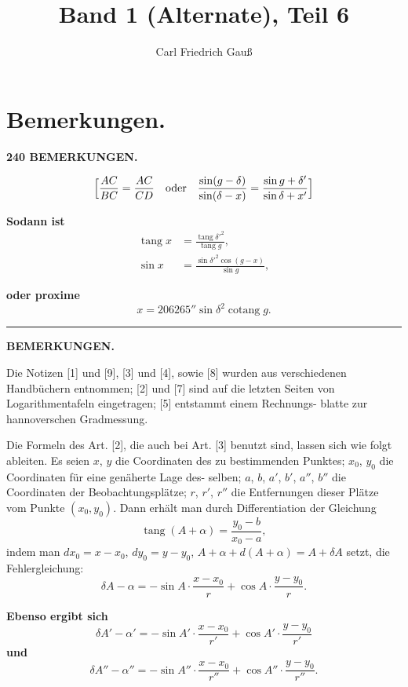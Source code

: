 \documentclass[12pt,a4paper]{article}
\title{Band 1 (Alternate), Teil 6}
\author{Carl Friedrich Gau\ss}
\date{}
\theoremstyle{plain}
\theoremstyle{definition}
\theoremstyle{remark}
\DeclareMathOperator{\tang}{tang}
\DeclareMathOperator{\cotang}{cotang}
\begin{document}
\maketitle

\newpage

\section*{Bemerkungen.}

\noindent\textbf{240 BEMERKUNGEN.}

\[
\Bigl[\frac{AC}{BC} = \frac{AC}{CD} \quad\text{oder}\quad
\frac{\sin(g-\delta)}{\sin(\delta-x)} = \frac{\sin g + \delta'}{\sin\delta + x'} \Bigr]
\]

\textbf{Sodann ist}
\begin{align*}
\tang x &= \frac{\tang\delta'^2}{\tang g},\\
\sin x &= \frac{\sin\delta'^2 \cos(g-x)}{\sin g},
\end{align*}

\textbf{oder proxime}
\[
x = 206265'' \sin\delta^2 \cotang g.
\]

\bigskip\hrule\bigskip

\begin{center}\textbf{BEMERKUNGEN.}\end{center}

Die Notizen [1] und [9], [3] und [4], sowie [8] wurden aus verschiedenen Handb\"uchern entnommen; [2]
und [7] sind auf die letzten Seiten von Logarithmentafeln eingetragen; [5] entstammt einem Rechnungs-
blatte zur hannoverschen Gradmessung.

Die Formeln des Art. [2], die auch bei Art. [3] benutzt sind, lassen sich wie folgt ableiten. Es seien
$x$, $y$ die Coordinaten des zu bestimmenden Punktes; $x_0$, $y_0$ die Coordinaten f\"ur eine gen\"aherte Lage des-
selben; $a$, $b$, $a'$, $b'$, $a''$, $b''$ die Coordinaten der Beobachtungspl\"atze; $r$, $r'$, $r''$ die Entfernungen dieser
Pl\"atze vom Punkte $(x_0, y_0)$. Dann erh\"alt man durch Differentiation der Gleichung
\[
\tang(A+\alpha) = \frac{y_0 - b}{x_0 - a},
\]
indem man $dx_0 = x - x_0$, $dy_0 = y - y_0$, $A + \alpha + d(A + \alpha) = A + \delta A$ setzt, die Fehlergleichung:
\[
\delta A - \alpha = -\sin A \cdot \frac{x - x_0}{r} + \cos A \cdot \frac{y - y_0}{r}.
\]

\textbf{Ebenso ergibt sich}
\[
\delta A' - \alpha' = -\sin A' \cdot \frac{x - x_0}{r'} + \cos A' \cdot \frac{y - y_0}{r'}
\]
\textbf{und}
\[
\delta A'' - \alpha'' = -\sin A'' \cdot \frac{x - x_0}{r''} + \cos A'' \cdot \frac{y - y_0}{r''}.
\]
\end{document}
